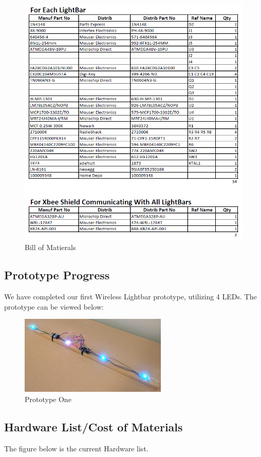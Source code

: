 \documentclass[12pt]{article}
\begin{document}
{{{{			\begin{figure}[ht!]
				\centering
				\includegraphics[width=170mm]{assets/Bill_of_Materials_Pg2.png}
				\caption{Bill of Matierals}
			\end{figure}
		
		\subsection{Prototype Progress}
			We have completed our first Wireless Lightbar prototype, utilizing 4 LEDs. The prototype can be viewed below:
			
			\begin{figure}[ht!]
				\centering
				\includegraphics[width=70mm]{assets/prototype.jpg}
				\caption{Prototype One}
			\end{figure}
	
		\subsection{Hardware List/Cost of Materials}
			The figure below is the current Hardware list.
			
}}}}
\end{document}
